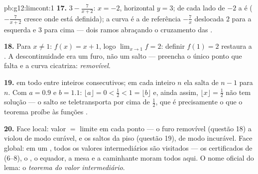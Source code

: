 \begin{solution}{pb:g12:limcont:1}
\textbf{17.} $3 - \frac{7}{x + 2}$: 
$x = -2$, horizontal $y = 3$; de cada lado de $-2$ a  é
 ($-\frac{7}{x+2}$ cresce onde está definida); a curva
é a  de referência $-\frac7x$ deslocada $2$ para a
esquerda e $3$ para cima --- dois ramos abraçando o cruzamento
das .

\textbf{18.} Para $x \neq 1$: $f(x) = x + 1$, logo
$\lim_{x \to 1} f = 2$: definir $f(1) = 2$ restaura a
. A descontinuidade era um furo, não um salto ---
preencha o único ponto que falta e a curva cicatriza:
\emph{removível}.

\textbf{19.}  em todo  entre inteiros
consecutivos; em cada inteiro $n$ ela salta de $n - 1$ para
$n$. Com $a = 0.9$ e $b = 1.1$:
$\lfloor a \rfloor = 0 < \frac12 < 1 = \lfloor b \rfloor$ e,
ainda assim, $\lfloor x \rfloor = \frac12$ não tem solução ---
o salto se teletransporta por cima de $\frac12$, que é
precisamente o que o teorema proíbe às funções .

\textbf{20.} Face local: valor $=$ limite em cada ponto --- o
furo removível (questão 18) a violou de modo curável, e os
saltos da  piso (questão 19), de modo incurável. Face
global: em um , todos os valores intermediários são
visitados --- os certificados de  (6--8), o , o
equador, a mesa e a caminhante moram todos aqui. O nome oficial
do lema: o \emph{teorema do valor intermediário}.
\end{solution}

